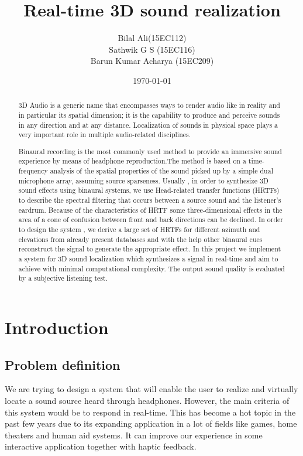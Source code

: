 \documentclass[BTech]{nitkdiss}
\title{Real-time 3D sound realization}
\author{Bilal Ali(15EC112)\\Sathwik G S (15EC116)\\ Barun Kumar Acharya (15EC209)\\}
\date{\today}
\begin{document}
\maketitle
\pagestyle{plain}
\tableofcontents
\listoffigures
\newpage
\begin{abstract}
3D Audio is a generic name that encompasses ways to render audio like in reality and in particular its spatial dimension; it is the capability to produce and perceive sounds in any direction and at any distance. Localization of sounds in physical space plays a very important role in multiple audio-related disciplines.

  Binaural recording is the most commonly used method to provide an immersive sound experience by means of headphone reproduction.The method is based on a time-frequency analysis of the spatial properties of the sound picked up by a simple dual microphone array, assuming source sparseness. 
  Usually  ,  in  order  to synthesize 3D  sound effects  using  binaural  
systems,  we  use  Head-related    transfer    functions    (HRTFs)    to  describe    the    spectral  
filtering    that  occurs  between    a    source  sound  and  the  listener’s  eardrum.  Because  of  the  
characteristics  of  HRTF  some  three-dimensional  effects  in  the  area  of  a  cone  of  confusion  
between front and back directions can be declined. In order to design the system , we derive a large 
set  of  HRTFs  for  different  azimuth  and  elevations  from already present databases and with the help other binaural cues reconstruct the signal to generate the appropriate effect. 
In  this  project  we implement a system for 3D  sound  localization which synthesizes a signal in real-time and aim to achieve with minimal computational complexity. The output sound  quality  is  
evaluated by a subjective listening test. 
\end{abstract}

\chapter{Introduction}
\section{Problem definition } 
We are trying to design a system that will enable the user to realize and virtually locate a sound source heard through headphones. However, the main criteria of this system would be to respond in real-time.
This has become a hot topic in the past few years due to its expanding application in a lot of fields like games, home theaters and human aid systems.  It can improve our experience in some interactive application together with haptic feedback.  
\end{document}
